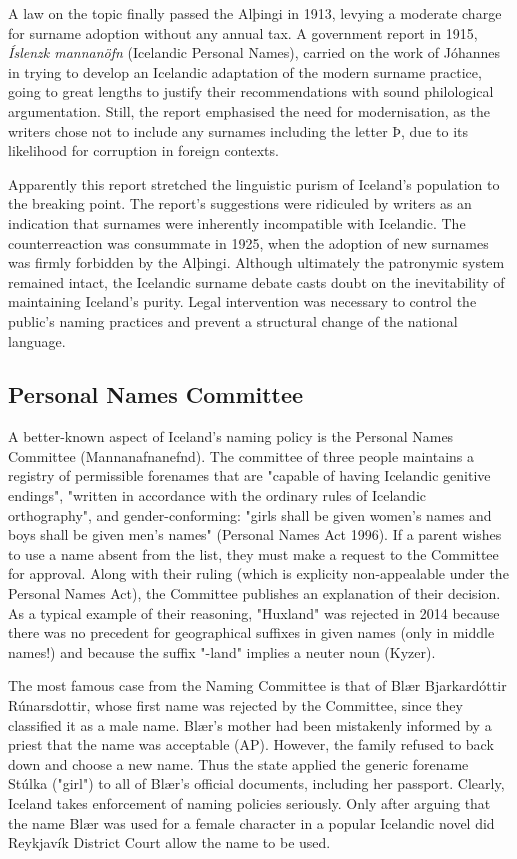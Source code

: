 A law on the topic finally passed the Alþingi in 1913, levying a moderate charge for surname adoption without any annual tax. A government report in 1915, \textit{Íslenzk mannanöfn} (Icelandic Personal Names), carried on the work of Jóhannes in trying to develop an Icelandic adaptation of the modern surname practice, going to great lengths to justify their recommendations with sound philological argumentation. Still, the report emphasised the need for modernisation, as the writers chose not to include any surnames including the letter Þ, due to its likelihood for corruption in foreign contexts.

Apparently this report stretched the linguistic purism of Iceland's population to the breaking point. The report's suggestions were ridiculed by writers as an indication that surnames were inherently incompatible with Icelandic. The counterreaction was consummate in 1925, when the adoption of new surnames was firmly forbidden by the Alþingi. Although ultimately the patronymic system remained intact, the Icelandic surname debate casts doubt on the inevitability of maintaining Iceland's purity. Legal intervention was necessary to control the public's naming practices and prevent a structural change of the national language.

\subsection{Personal Names Committee}

A better-known aspect of Iceland's naming policy is the Personal Names Committee (Mannanafnanefnd). The committee of three people maintains a registry of permissible forenames that are "capable of having Icelandic genitive endings", "written in accordance with the ordinary rules of Icelandic orthography", and gender-conforming: "girls shall be given women's names and boys shall be given men's names" (Personal Names Act 1996). If a parent wishes to use a name absent from the list, they must make a request to the Committee for approval. Along with their ruling (which is explicity non-appealable under the Personal Names Act), the Committee publishes an explanation of their decision. As a typical example of their reasoning, "Huxland" was rejected in 2014 because there was no precedent for geographical suffixes in given names (only in middle names!) and because the suffix "-land" implies a neuter noun (Kyzer).

The most famous case from the Naming Committee is that of Blær Bjarkardóttir Rúnarsdottir, whose first name was rejected by the Committee, since they classified it as a male name. Blær's mother had been mistakenly informed by a priest that the name was acceptable (AP). However, the family refused to back down and choose a new name. Thus the state applied the generic forename Stúlka ("girl") to all of Blær's official documents, including her passport. Clearly, Iceland takes enforcement of naming policies seriously. Only after arguing that the name Blær was used for a female character in a popular Icelandic novel did Reykjavík District Court allow the name to be used.

